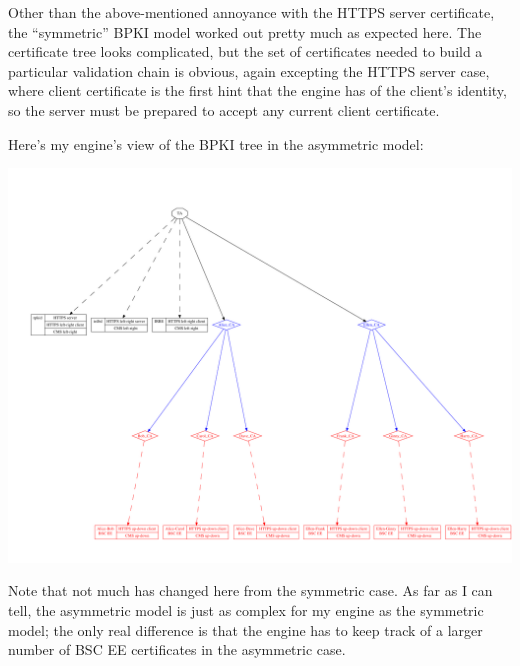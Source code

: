 \documentclass[11pt]{article}
\begin{document}
Other than the above-mentioned annoyance with the HTTPS server
certificate, the ``symmetric'' BPKI model worked out pretty much as
expected here.  The certificate tree looks complicated, but the set of
certificates needed to build a particular validation chain is obvious,
again excepting the HTTPS server case, where client certificate is the
first hint that the engine has of the client's identity, so the server
must be prepared to accept any current client certificate.

Here's my engine's view of the BPKI tree in the asymmetric model:

\begin{center}
\includegraphics[width = 6.5in]{bpki-asymmetric}
\end{center}

Note that not much has changed here from the symmetric case.  As far
as I can tell, the asymmetric model is just as complex for my engine
as the symmetric model; the only real difference is that the engine
has to keep track of a larger number of BSC EE certificates in the
asymmetric case.
\end{document}
